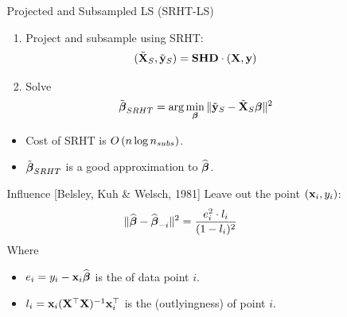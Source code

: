 \documentclass[final,t,english,professionalfonts, xcolor=dvipsnames]{beamer}
\begin{document}
\begin{frame}{}
{\begin{minipage}[c]{0.96\linewidth}
\begin{columns}[t]
\begin{column}{.33\linewidth}
\end{column}
\begin{column}{.33\linewidth}




\begin{block}{Projected and Subsampled LS (SRHT-LS)}
\begin{enumerate}
\item Project and subsample using SRHT: $$(\tilde{{\mathbf{X}}}_S,\tilde{\mathbf{y}}_S) = {\mathbf{S}}{\mathbf{H}}{\mathbf{D}} \cdot ({\mathbf{X}}, \mathbf{y})$$
\item Solve
$$
\tilde{\boldsymbol{\beta}}_{SRHT} = \arg\min_{\boldsymbol{\beta}} \Vert {  \tilde{\mathbf{y}}_S  - \tilde{{\mathbf{X}}}_S \boldsymbol{\beta}} \Vert^2
$$
\end{enumerate}
\begin{itemize}
\setlength{\itemsep}{0.5cm}
\item Cost of SRHT is $O \left( { n \log n_{subs} } \right)$.
\item $\tilde{\boldsymbol{\beta}}_{SRHT}$ is a good approximation to $\widehat{\boldsymbol{\beta}}$.
\end{itemize}
\vspace{1cm}
\end{block}



\begin{block}{Influence {\footnotesize [Belsley, Kuh \& Welsch, 1981]}}
Leave out the point $(\mathbf{x}_i,y_i)$:
\begin{align*}
\nrm{\estbeta - \estbeta_{-i}}^2 %
& = \frac{e^2_i \cdot l_i}{(1-l_i)^2}
\end{align*}
Where
\begin{itemize}
\setlength{\itemsep}{0.5cm}
\item $e_i = y_i - \mathbf{x}_i\widehat{\boldsymbol{\beta}}$ is the   of data point $i$.
\item $l_i=\mathbf{x}_i({\mathbf{X}}^{\top}{\mathbf{X}})^{-1}\mathbf{x}_i^{\top}$ is the  (outlyingness) of point $i$.
\end{itemize}
\vspace{1cm}
\end{block}



\end{column}
\end{columns}
\end{minipage}}
\end{frame}
\end{document}
